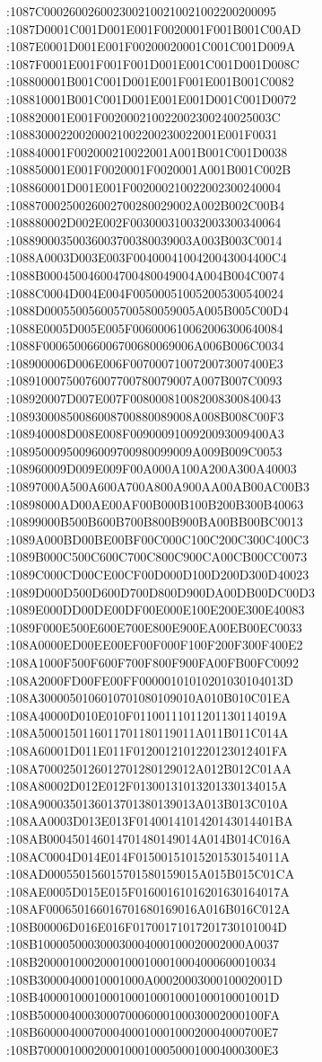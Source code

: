 :1087C0002600260023002100210021002200200095
:1087D0001C001D001E001F0020001F001B001C00AD
:1087E0001D001E001F00200020001C001C001D009A
:1087F0001E001F001F001D001E001C001D001D008C
:108800001B001C001D001E001F001E001B001C0082
:108810001B001C001D001E001E001D001C001D0072
:108820001E001F002000210022002300240025003C
:108830002200200021002200230022001E001F0031
:108840001F002000210022001A001B001C001D0038
:108850001E001F0020001F0020001A001B001C002B
:108860001D001E001F002000210022002300240004
:10887000250026002700280029002A002B002C00B4
:108880002D002E002F003000310032003300340064
:10889000350036003700380039003A003B003C0014
:1088A0003D003E003F0040004100420043004400C4
:1088B000450046004700480049004A004B004C0074
:1088C0004D004E004F005000510052005300540024
:1088D000550056005700580059005A005B005C00D4
:1088E0005D005E005F006000610062006300640084
:1088F000650066006700680069006A006B006C0034
:108900006D006E006F0070007100720073007400E3
:10891000750076007700780079007A007B007C0093
:108920007D007E007F008000810082008300840043
:10893000850086008700880089008A008B008C00F3
:108940008D008E008F0090009100920093009400A3
:10895000950096009700980099009A009B009C0053
:108960009D009E009F00A000A100A200A300A40003
:10897000A500A600A700A800A900AA00AB00AC00B3
:10898000AD00AE00AF00B000B100B200B300B40063
:10899000B500B600B700B800B900BA00BB00BC0013
:1089A000BD00BE00BF00C000C100C200C300C400C3
:1089B000C500C600C700C800C900CA00CB00CC0073
:1089C000CD00CE00CF00D000D100D200D300D40023
:1089D000D500D600D700D800D900DA00DB00DC00D3
:1089E000DD00DE00DF00E000E100E200E300E40083
:1089F000E500E600E700E800E900EA00EB00EC0033
:108A0000ED00EE00EF00F000F100F200F300F400E2
:108A1000F500F600F700F800F900FA00FB00FC0092
:108A2000FD00FE00FF00000101010201030104013D
:108A3000050106010701080109010A010B010C01EA
:108A40000D010E010F01100111011201130114019A
:108A5000150116011701180119011A011B011C014A
:108A60001D011E011F0120012101220123012401FA
:108A7000250126012701280129012A012B012C01AA
:108A80002D012E012F01300131013201330134015A
:108A9000350136013701380139013A013B013C010A
:108AA0003D013E013F0140014101420143014401BA
:108AB000450146014701480149014A014B014C016A
:108AC0004D014E014F01500151015201530154011A
:108AD000550156015701580159015A015B015C01CA
:108AE0005D015E015F01600161016201630164017A
:108AF000650166016701680169016A016B016C012A
:108B00006D016E016F01700171017201730101004D
:108B100005000300030004000100020002000A0037
:108B20000100020001000100010004000600010034
:108B30000400010001000A0002000300010002001D
:108B4000010001000100010001000100010001001D
:108B500004000300070006000100030002000100FA
:108B600004000700040001000100020004000700E7
:108B700001000200010001000500010004000300E3
